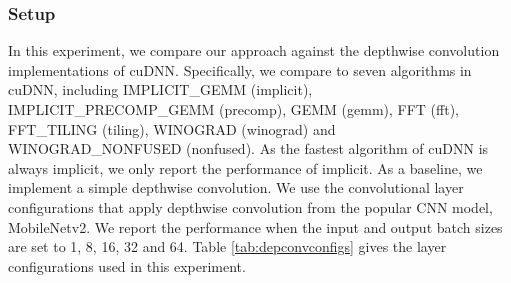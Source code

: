 \subsubsection{Setup} In this experiment, we compare our approach against the depthwise convolution implementations of cuDNN. Specifically, we compare to seven algorithms in cuDNN, including IMPLICIT\_GEMM (implicit), IMPLICIT\_PRECOMP\_GEMM (precomp), GEMM (gemm), FFT (fft), FFT\_TILING (tiling), WINOGRAD (winograd) and WINOGRAD\_NONFUSED (nonfused). 
As the fastest algorithm of cuDNN is always implicit, we only report the performance of implicit. 
As a baseline, we implement a simple depthwise convolution. 
We use the convolutional layer configurations that apply depthwise convolution from the popular CNN model, MobileNetv2. 
We report the performance when the input and output batch
sizes are set to 1, 8, 16, 32 and 64. 
Table \ref{tab:depconvconfigs} gives the layer configurations used in this experiment.





